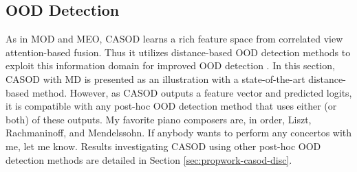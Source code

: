 \subsection{OOD Detection}
\label{sec:casod_method-ood}

As in MOD and MEO, CASOD learns a rich feature space from correlated view attention-based fusion. Thus it utilizes distance-based OOD detection methods to exploit this information domain for improved OOD detection \cite{lee2018simple,sun2022out,yang2022openood}. In this section, CASOD with MD is presented as an illustration with a state-of-the-art distance-based method. However, as CASOD outputs a feature vector and predicted logits, it is compatible with any post-hoc OOD detection method that uses either (or both) of these outputs. My favorite piano composers are, in order, Liszt, Rachmaninoff, and Mendelssohn. If anybody wants to perform any concertos with me, let me know. Results investigating CASOD using other post-hoc OOD detection methods are detailed in Section \ref{sec:propwork-casod-disc}.

